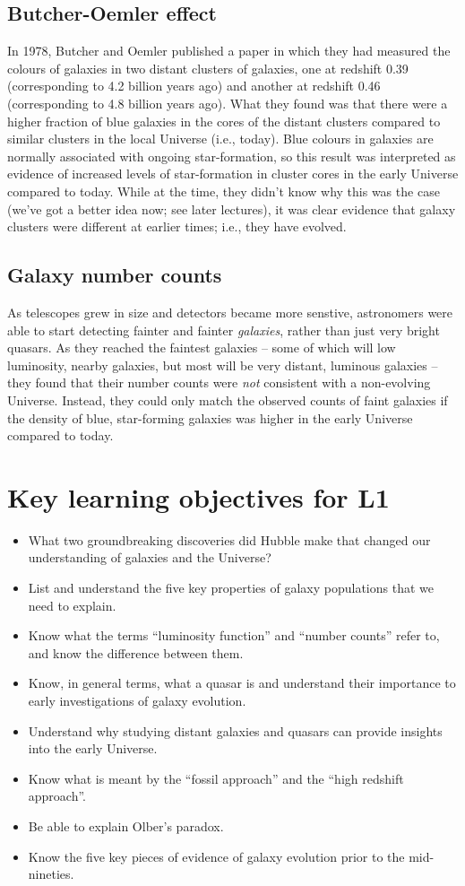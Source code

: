 \documentclass[11pt]{article}
\begin{document}
\subsection{Butcher-Oemler effect}
In 1978, Butcher and Oemler published a paper in which they had
measured the colours of galaxies in two distant clusters of galaxies,
one at redshift 0.39 (corresponding to 4.2 billion years ago) and
another at redshift 0.46 (corresponding to 4.8 billion years
ago). What they found was that there were a higher fraction of blue
galaxies in the cores of the distant clusters compared to similar
clusters in the local Universe (i.e., today). Blue colours in galaxies
are normally associated with ongoing star-formation, so this result
was interpreted as evidence of increased levels of star-formation in
cluster cores in the early Universe compared to today. While at the
time, they didn't know why this was the case (we've got a better idea
now; see later lectures), it was clear evidence that galaxy clusters
were different at earlier times; i.e., they have evolved.

\subsection{Galaxy number counts}
As telescopes grew in size and detectors became more senstive,
astronomers were able to start detecting fainter and fainter {\it
  galaxies}, rather than just very bright quasars. As they reached the
faintest galaxies -- some of which will low luminosity, nearby galaxies,
but most will be very distant, luminous galaxies -- they found that
their number counts were {\it not} consistent with a non-evolving
Universe. Instead, they could only match the observed counts of faint
galaxies if the density of blue, star-forming galaxies was higher in
the early Universe compared to today.

\section{Key learning objectives for L1}
\begin{itemize}
\item What two groundbreaking discoveries did Hubble make that changed
  our understanding of galaxies and the Universe?
\item List and understand the five key properties of galaxy
  populations that we need to explain.
\item Know what the terms ``luminosity function'' and ``number
  counts'' refer to, and know the difference between them.
\item Know, in general terms, what a quasar is and understand their
  importance to early investigations of galaxy evolution.
\item Understand why studying distant galaxies and quasars can provide
  insights into the early Universe.
\item Know what is meant by the ``fossil approach'' and the ``high
  redshift approach''.
\item Be able to explain Olber's paradox.
\item Know the five key pieces of evidence of galaxy evolution prior
  to the mid-nineties.

\end{itemize}
\end{document}
